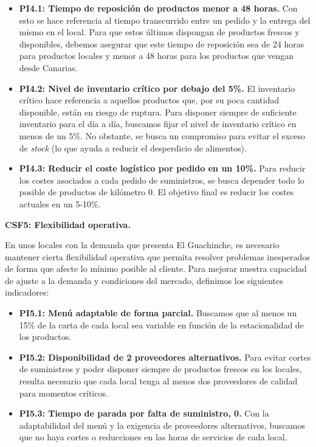 \documentclass[12pt]{opticajnl}
\begin{document}
\begin{itemize}
    \item \textbf{PI4.1: Tiempo de reposición de productos menor a 48 horas.} Con esto se hace referencia al tiempo transcurrido entre un pedido y la entrega del mismo en el local. Para que estos últimos dispongan de productos frescos y disponibles, debemos asegurar que este tiempo de reposición sea de 24 horas para productos locales y menor a 48 horas para los productos que vengan desde Canarias. 
    \item \textbf{PI4.2: Nivel de inventario crítico por debajo del 5\%.} El inventario crítico hace referencia a aquellos productos que, por su poca cantidad disponible, están en riesgo de ruptura. Para disponer siempre de suficiente inventario para el día a día, buscamos fijar el nivel de inventario crítico en menos de un 5\%. No obstante, se busca un compromiso para evitar el exceso de \textit{stock} (lo que ayuda a reducir el desperdicio de alimentos).
    \item \textbf{PI4.3: Reducir el coste logístico por pedido en un 10\%.} Para reducir los costes asociados a cada pedido de suministros, se busca depender todo lo posible de productos de kilómetro 0. El objetivo final es reducir los costes actuales en un 5-10\%.
\end{itemize}

\textbf{CSF5: Flexibilidad operativa.}

En unos locales con la demanda que presenta El Guachinche, es necesario mantener cierta flexibilidad operativa que permita resolver problemas inesperados de forma que afecte lo mínimo posible al cliente. Para mejorar nuestra capacidad de ajuste a la demanda y condiciones del mercado, definimos los siguientes indicadores:

\begin{itemize}
    \item \textbf{PI5.1: Menú adaptable de forma parcial.} Buscamos que al menos un 15\% de la carta de cada local sea variable en función de la estacionalidad de los productos. 
    \item \textbf{PI5.2: Disponibilidad de 2 proveedores alternativos.} Para evitar cortes de suministros y poder disponer siempre de productos frescos en los locales, resulta necesario que cada local tenga al menos dos proveedores de calidad para momentos críticos.
    \item \textbf{PI5.3: Tiempo de parada por falta de suministro, 0.} Con la adaptabilidad del menú y la exigencia de proveedores alternativos, buscamos que no haya cortes o reducciones en las horas de servicios de cada local.    
\end{itemize}
\end{document}
